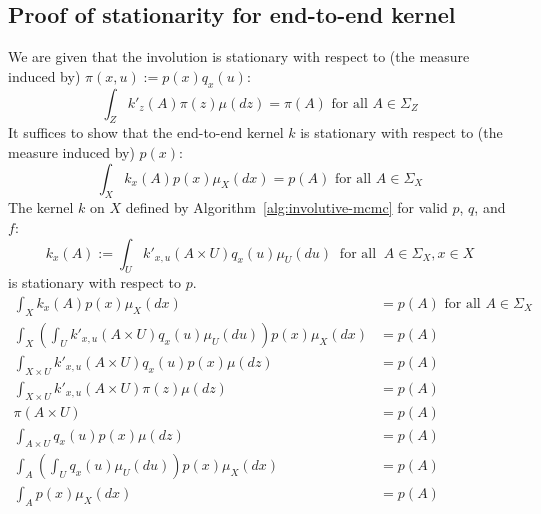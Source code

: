 \documentclass[twoside]{article}
\begin{document}
\subsection{Proof of stationarity for end-to-end kernel}
We are given that the involution is stationary with respect to (the measure induced by) $\pi(x, u) := p(x) q_x(u)$:
\[
\int_Z k'_z(A) \pi(z) \mu(dz) = \pi(A) \mbox{ for all } A \in \Sigma_Z
\]
It suffices to show that the end-to-end kernel $k$ is stationary with respect to (the measure induced by) $p(x)$:
\[
\int_X k_x(A) p(x) \mu_X(dx) = p(A) \mbox{ for all } A \in \Sigma_X
\]
The kernel $k$ on $X$ defined by Algorithm~\ref{alg:involutive-mcmc} for valid $p$, $q$, and $f$:
\[
k_x(A) := \int_U k'_{x,u}(A \times U) q_x(u) \mu_U(du) \;\; \mbox{for all} \;\; A \in \Sigma_X, x \in X
\]
is stationary with respect to $p$.
\begin{align*}
    \int_X k_x(A) p(x) \mu_X(dx) &= p(A) \mbox{ for all } A \in \Sigma_X\\
    \int_X \left( \int_U k'_{x,u}(A \times U) q_x(u) \mu_U(du) \right) p(x) \mu_X(dx) &= p(A)\\
    \int_{X \times U} k'_{x,u}(A \times U) q_x(u) p(x) \mu(dz) &= p(A)\\
    \int_{X \times U} k'_{x,u}(A \times U) \pi(z) \mu(dz) &= p(A)\\
    \pi(A \times U) &= p(A)\\
    \int_{A \times U} q_x(u) p(x) \mu(dz) &= p(A)\\
    \int_A \left( \int_U q_x(u) \mu_U(du) \right) p(x) \mu_X(dx) &= p(A)\\
    \int_A p(x) \mu_X(dx) &= p(A)
\end{align*}
\end{document}
